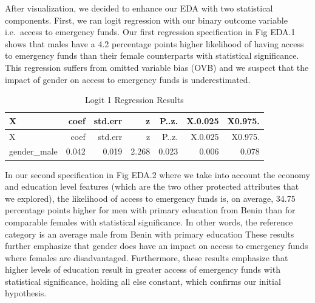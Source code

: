 \documentclass[12pt]{article}
\begin{document}
After visualization, we decided to enhance our EDA with two statistical
components. First, we ran logit regression with our binary outcome
variable i.e.~access to emergency funds. Our first regression
specification in Fig EDA.1 shows that males have a 4.2 percentage points
higher likelihood of having access to emergency funds than their female
counterparts with statistical significance. This regression suffers from
omitted variable bias (OVB) and we suspect that the impact of gender on
access to emergency funds is underestimated.

\begin{longtable}[]{@{}lrrrrrr@{}}
\caption{Logit 1 Regression Results}\tabularnewline
\toprule\noalign{}
X & coef & std.err & z & P..z. & X.0.025 & X0.975. \\
\midrule\noalign{}
\endfirsthead
\toprule\noalign{}
X & coef & std.err & z & P..z. & X.0.025 & X0.975. \\
\midrule\noalign{}
\endhead
\bottomrule\noalign{}
\endlastfoot
gender\_male & 0.042 & 0.019 & 2.268 & 0.023 & 0.006 & 0.078 \\
\end{longtable}

In our second specification in Fig EDA.2 where we take into account the
economy and education level features (which are the two other protected
attributes that we explored), the likelihood of access to emergency
funds is, on average, 34.75 percentage points higher for men with
primary education from Benin than for comparable females with
statistical significance. In other words, the reference category is an
average male from Benin with primary education These results further
emphasize that gender does have an impact on access to emergency funds
where females are disadvantaged. Furthermore, these results emphasize
that higher levels of education result in greater access of emergency
funds with statistical significance, holding all else constant, which
confirms our initial hypothesis.
\end{document}
